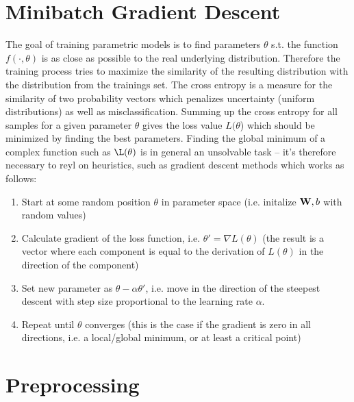 \section{Minibatch Gradient Descent}
The goal of training parametric models is to find parameters $\theta$ s.t. the function $f(\cdot, \theta)$ is as close as possible to the real underlying distribution. Therefore the training process tries to maximize the similarity of the resulting distribution with the distribution from the trainings set. The cross entropy is a measure for the similarity of two probability vectors which penalizes uncertainty (uniform distributions) as well as misclassification. Summing up the cross entropy for all samples for a given parameter $\theta$ gives the loss value $L(\theta$) which should be minimized by finding the best parameters. Finding the global minimum of a complex function such as $\L(\theta)$ is in general an unsolvable task -- it's therefore necessary to reyl on heuristics, such as gradient descent methods which works as follows:
\begin{enumerate}
\item Start at some random position $\theta$ in parameter space (i.e. initalize $\textbf W, b$ with random values)
\item Calculate gradient of the loss function, i.e. $\theta' = \nabla L(\theta)$ (the result is a vector where each component is equal to the derivation of $L(\theta)$ in the direction of the component) 
\item Set new parameter as $\theta  - \alpha \theta'$, i.e. move in the direction of the steepest descent with step size proportional to the learning rate $\alpha$.
\item Repeat until $\theta$ converges (this is the case if the gradient is zero in all directions, i.e. a local/global minimum, or at least a critical point)
\end{enumerate}



\section{Preprocessing}

